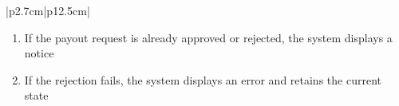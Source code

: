 \begin{table}[H]
\begin{tabular}{|p{2.7cm}|p{12.5cm}|}
\begin{minipage}[t]{\linewidth}
\begin{enumerate}[topsep=0pt,itemsep=1pt,parsep=0pt,partopsep=0pt]
                                          \item If the payout request is already approved or rejected, the system displays a
                                                notice
                                          \item If the rejection fails, the system displays an error and retains the current
                                                state
                                      \end{enumerate}
                                  \end{minipage} \\
        \hline
    \end{tabular}
    \label{tab:admin-reject-payout-request}
\end{table}
